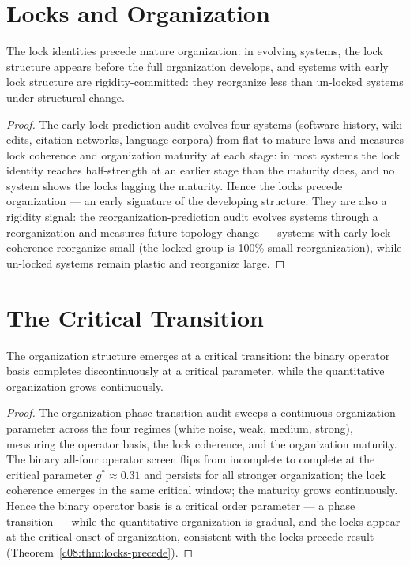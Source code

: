 \section{Locks and Organization}
\label{c08:sec:locks-organization}

\begin{theorem}
\label{c08:thm:locks-precede}
The lock identities precede mature organization: in evolving systems, the lock structure
appears before the full organization develops, and systems with early lock structure are
rigidity-committed: they reorganize less than un-locked systems under structural change.
\end{theorem}

\begin{proof}
The early-lock-prediction audit \cite{c08:QG315} evolves four systems (software history,
wiki edits, citation networks, language corpora) from flat to mature laws and measures lock
coherence and organization maturity at each stage: in most systems the lock identity reaches
half-strength at an earlier stage than the maturity does, and no system shows the locks
lagging the maturity. Hence the locks precede organization --- an early signature of the
developing structure. They are also a rigidity signal: the reorganization-prediction audit
\cite{c08:QG318} evolves systems through a reorganization and measures future topology
change --- systems with early lock coherence reorganize small (the locked group is 100\%
small-reorganization), while un-locked systems remain plastic and reorganize large.
\end{proof}

\section{The Critical Transition}
\label{c08:sec:critical-transition}

\begin{theorem}
\label{c08:thm:phase-transition}
The organization structure emerges at a critical transition: the binary operator basis
completes discontinuously at a critical parameter, while the quantitative organization
grows continuously.
\end{theorem}

\begin{proof}
The organization-phase-transition audit \cite{c08:QG316} sweeps a continuous organization
parameter across the four regimes (white noise, weak, medium, strong), measuring the
operator basis, the lock coherence, and the organization maturity. The binary all-four
operator screen flips from incomplete to complete at the critical parameter $g^\ast \approx
0.31$ and persists for all stronger organization; the lock coherence emerges in the same
critical window; the maturity grows continuously. Hence the binary operator basis is a
critical order parameter --- a phase transition --- while the quantitative organization is
gradual, and the locks appear at the critical onset of organization, consistent with the
locks-precede result (Theorem~\ref{c08:thm:locks-precede}).
\end{proof}

